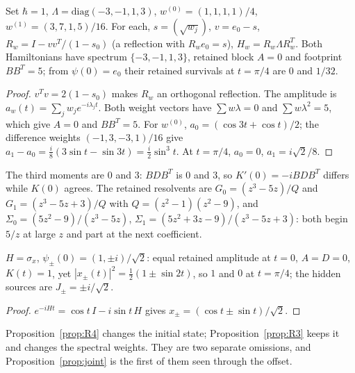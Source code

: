 \begin{proposition}\label{prop:R3}
Set $\hbar=1$, $\Lambda=\mathrm{diag}(-3,-1,1,3)$, $w^{(0)}=(1,1,1,1)/4$, $w^{(1)}=(3,7,1,5)/16$. For each, $s=(\sqrt{w_j})$, $v=e_0-s$, $R_w=I-vv^T/(1-s_0)$ (a reflection with $R_we_0=s$), $H_w=R_w\Lambda R_w^T$. Both Hamiltonians have spectrum $\{-3,-1,1,3\}$, retained block $A=0$ and footprint $BB^T=5$; from $\psi(0)=e_0$ their retained survivals at $t=\pi/4$ are $0$ and $1/32$. 
\end{proposition}
\begin{proof}
$v^Tv=2(1-s_0)$ makes $R_w$ an orthogonal reflection. The amplitude is $a_w(t)=\sum_jw_je^{-i\lambda_jt}$. Both weight vectors have $\sum w\lambda=0$ and $\sum w\lambda^2=5$, which give $A=0$ and $BB^T=5$. For $w^{(0)}$, $a_0=(\cos3t+\cos t)/2$; the difference weights $(-1,3,-3,1)/16$ give $a_1-a_0=\frac i8(3\sin t-\sin3t)=\frac i2\sin^3t$. At $t=\pi/4$, $a_0=0$, $a_1=i\sqrt2/8$.
\end{proof}
The third moments are $0$ and $3$: $BDB^T$ is $0$ and $3$, so $K'(0)=-iBDB^T$ differs while $K(0)$ agrees. The retained resolvents are $G_0=(z^3-5z)/Q$ and $G_1=(z^3-5z+3)/Q$ with $Q=(z^2-1)(z^2-9)$, and $\Sigma_0=(5z^2-9)/(z^3-5z)$, $\Sigma_1=(5z^2+3z-9)/(z^3-5z+3)$: both begin $5/z$ at large $z$ and part at the next coefficient.

\begin{proposition}\label{prop:R4}
$H=\sigma_x$, $\psi_\pm(0)=(1,\pm i)/\sqrt2$: equal retained amplitude at $t=0$, $A=D=0$, $K(t)=1$, yet $|x_\pm(t)|^2=\tfrac12(1\pm\sin2t)$, so $1$ and $0$ at $t=\pi/4$; the hidden sources are $J_\pm=\pm i/\sqrt2$. 
\end{proposition}
\begin{proof}
$e^{-iHt}=\cos t\,I-i\sin t\,H$ gives $x_\pm=(\cos t\pm\sin t)/\sqrt2$.
\end{proof}
Proposition~\ref{prop:R4} changes the initial state; Proposition~\ref{prop:R3} keeps it and changes the spectral weights. They are two separate omissions, and Proposition~\ref{prop:joint} is the first of them seen through the offset.

